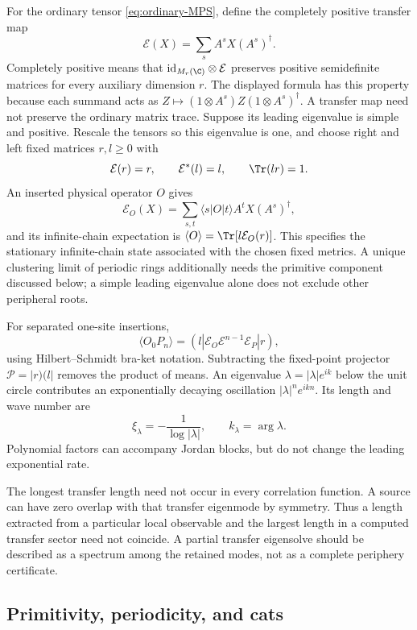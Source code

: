 For the ordinary tensor \eqref{eq:ordinary-MPS}, define the completely
positive transfer map
\[
 \mathcal E(X)=\sum_sA^sX(A^s)^\dagger.
\]
Completely positive means that
$\mathrm{id}_{M_r(\C)}\otimes\mathcal E$ preserves positive
semidefinite matrices for every auxiliary dimension $r$.
The displayed formula has this property because each summand acts
as $Z\mapsto(1\otimes A^s)Z(1\otimes A^s)^\dagger$.
A transfer map need not preserve the ordinary matrix trace.
Suppose its leading eigenvalue is simple and positive. Rescale the
tensors so this eigenvalue is one, and choose right and left fixed
matrices $r,l\geq0$ with
\[
 \mathcal E(r)=r,\qquad \mathcal E^*(l)=l,\qquad \Tr(lr)=1.
\]
An inserted physical operator $O$ gives
\[
 \mathcal E_O(X)=\sum_{s,t}\langle s|O|t\rangle
          A^tX(A^s)^\dagger,
\]
and its infinite-chain expectation is
$\langle O\rangle=\Tr[l\mathcal E_O(r)]$.
This specifies the stationary infinite-chain state associated with
the chosen fixed metrics. A unique clustering limit of periodic
rings additionally needs the primitive component discussed below;
a simple leading eigenvalue alone does not exclude other peripheral
roots.

For separated one-site insertions,
\[
 \langle O_0P_n\rangle
 =(l|\mathcal E_O\mathcal E^{n-1}\mathcal E_P|r),
\]
using Hilbert--Schmidt bra-ket notation. Subtracting the fixed-point
projector $\mathcal P=|r)(l|$ removes the product of means. An
eigenvalue $\lambda=|\lambda|e^{ik}$ below the unit circle contributes
an exponentially decaying oscillation
$|\lambda|^ne^{ikn}$. Its length and wave number are
\begin{equation}
 \xi_\lambda=-\frac1{\log|\lambda|},\qquad k_\lambda=\arg\lambda.
 \label{eq:MPS-correlation-length}
\end{equation}
Polynomial factors can accompany Jordan blocks, but do not change the
leading exponential rate.

The longest transfer length need not occur in every correlation
function. A source can have zero overlap with that transfer eigenmode
by symmetry. Thus a length extracted from a particular local observable
and the largest length in a computed transfer sector need not coincide.
A partial transfer eigensolve should be described as a spectrum among
the retained modes, not as a complete periphery certificate.

\subsection{Primitivity, periodicity, and cats}

